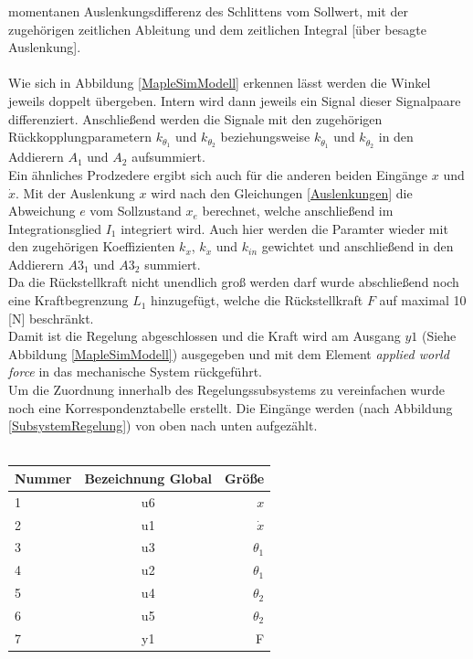 \documentclass[a4paper, 10pt]{report}
\begin{document}
momentanen Auslenkungsdifferenz des Schlittens vom Sollwert, mit der zugehörigen zeitlichen Ableitung und dem zeitlichen Integral [über besagte Auslenkung]. \\ \\
Wie sich in Abbildung \ref{MapleSimModell} erkennen lässt werden die Winkel jeweils doppelt übergeben. Intern wird dann jeweils ein Signal dieser Signalpaare differenziert. Anschließend werden die Signale mit den zugehörigen Rückkopplungparametern $k_{\theta_{1}}$ und $k_{\theta_{2}}$ beziehungsweise $k_{\dot{\theta}_{1}}$ und $k_{\dot{\theta}_{2}}$ in den Addierern $A_{1}$ und $A_{2}$ aufsummiert. \\
Ein ähnliches Prodzedere ergibt sich auch für die anderen beiden Eingänge $x$ und  $\dot{x}$. Mit der Auslenkung $x$ wird nach den Gleichungen \ref{Auslenkungen} die Abweichung $e$ vom Sollzustand $x_{e}$ berechnet, welche anschließend im Integrationsglied $I_{1}$ integriert wird. Auch hier werden die Paramter wieder mit den zugehörigen Koeffizienten $k_{x}$, $k_{\dot{x}}$ und $k_{in}$ gewichtet und anschließend in den Addierern $A3_{1}$ und $A3_{2}$ summiert. \\
Da die Rückstellkraft nicht unendlich groß werden darf wurde abschließend noch eine Kraftbegrenzung $L_{1}$ hinzugefügt, welche die Rückstellkraft $F$ auf maximal 10 [N] beschränkt. \\
Damit ist die Regelung abgeschlossen und die Kraft wird am Ausgang $y1$ (Siehe Abbildung \ref{MapleSimModell}) ausgegeben und mit dem Element \textit{applied world force} in das mechanische System rückgeführt. \\
Um die Zuordnung innerhalb des Regelungssubsystems zu vereinfachen wurde noch eine Korrespondenztabelle erstellt. Die Eingänge werden (nach Abbildung \ref{SubsystemRegelung}) von oben nach unten aufgezählt. \\ \\
\begin{center}
\begin{tabular}{ l | c | r }

 	Nummer & Bezeichnung Global & Größe \\	
	\hline
  	1 & u6 & $x$ \\
  	2 & u1 & $\dot{x}$ \\
  	3 & u3 & $\theta_{1}$ \\
  	4 & u2 & $\theta_{1}$ \\
  	5 & u4 & $\theta_{2}$ \\
  	6 & u5 & $\theta_{2}$ \\
	\hline
	7 & y1 & F
\end{tabular}
\end{center}
\end{document}
